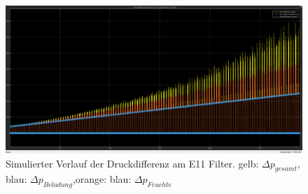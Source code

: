 \begin{figure}
    \includegraphics[height=0.85\textwidth,angle=90,origin=c]{images/sim_verlauf_druck.png}
    \caption[Simulierter Verlauf der Druckdifferenz am E11 Filter]{Simulierter Verlauf der Druckdifferenz am E11 Filter. gelb: $\Delta p_{gesamt}$, blau: $\Delta p_{Beladung}$,orange: blau: $\Delta p_{Feuchte}$}
    \label{fi:sim_verlauf_druck}
    \end{figure}
    \ \newpage
